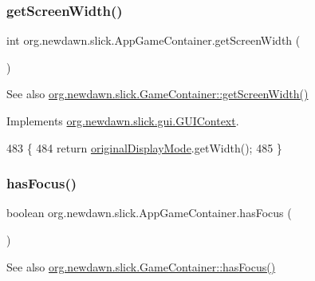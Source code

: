 \subsubsection{\texorpdfstring{get\+Screen\+Width()}{getScreenWidth()}}
{\footnotesize\ttfamily int org.\+newdawn.\+slick.\+App\+Game\+Container.\+get\+Screen\+Width (\begin{DoxyParamCaption}{ }\end{DoxyParamCaption})\hspace{0.3cm}{\ttfamily [inline]}}

\begin{DoxySeeAlso}{See also}
\mbox{\hyperlink{classorg_1_1newdawn_1_1slick_1_1_game_container_a4c84d852e74fa2eb0d1e05f924f5402b}{org.\+newdawn.\+slick.\+Game\+Container\+::get\+Screen\+Width()}} 
\end{DoxySeeAlso}


Implements \mbox{\hyperlink{interfaceorg_1_1newdawn_1_1slick_1_1gui_1_1_g_u_i_context_abbe4c9d529ed0c3dff177021f4839389}{org.\+newdawn.\+slick.\+gui.\+G\+U\+I\+Context}}.


\begin{DoxyCode}
483                                 \{
484         \textcolor{keywordflow}{return} \mbox{\hyperlink{classorg_1_1newdawn_1_1slick_1_1_app_game_container_a3c00ffa43a8e972598efe7bf27a577ba}{originalDisplayMode}}.getWidth();
485     \}
\end{DoxyCode}
\mbox{\label{classorg_1_1newdawn_1_1slick_1_1_app_game_container_a6f2465b04f3d5d08cd18b4b136fe2f46}} 
\subsubsection{\texorpdfstring{has\+Focus()}{hasFocus()}}
{\footnotesize\ttfamily boolean org.\+newdawn.\+slick.\+App\+Game\+Container.\+has\+Focus (\begin{DoxyParamCaption}{ }\end{DoxyParamCaption})\hspace{0.3cm}{\ttfamily [inline]}}

\begin{DoxySeeAlso}{See also}
\mbox{\hyperlink{classorg_1_1newdawn_1_1slick_1_1_game_container_a4fa0f77bdff52d66d2db55d8718b9867}{org.\+newdawn.\+slick.\+Game\+Container\+::has\+Focus()}} 
\end{DoxySeeAlso}

